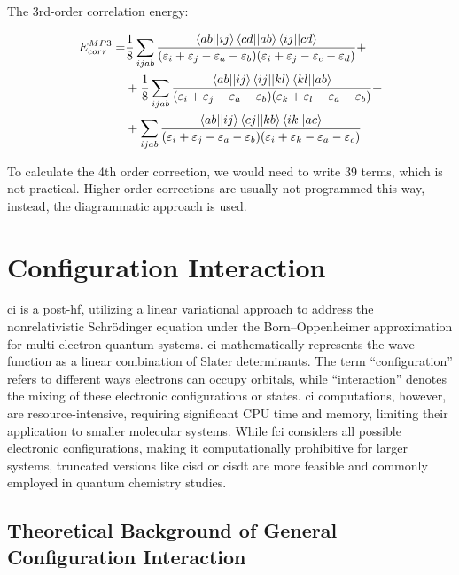 \documentclass[open=any,parskip=half,11pt]{scrbook}
\begin{document}
The 3rd-order correlation energy:

\begin{align}
E_{corr}^{MP3}=&\frac{1}{8}\sum_{ijab}\frac{\braket{ab||ij}\braket{cd||ab}\braket{ij||cd}}{(\varepsilon_i+\varepsilon_j-\varepsilon_a-\varepsilon_b)(\varepsilon_i+\varepsilon_j-\varepsilon_c-\varepsilon_d)}+ \\
&+\frac{1}{8}\sum_{ijab}\frac{\braket{ab||ij}\braket{ij||kl}\braket{kl||ab}}{(\varepsilon_i+\varepsilon_j-\varepsilon_a-\varepsilon_b)(\varepsilon_k+\varepsilon_l-\varepsilon_a-\varepsilon_b)}+ \\
&+\sum_{ijab}\frac{\braket{ab||ij}\braket{cj||kb}\braket{ik||ac}}{(\varepsilon_i+\varepsilon_j-\varepsilon_a-\varepsilon_b)(\varepsilon_i+\varepsilon_k-\varepsilon_a-\varepsilon_c)}
\end{align}

To calculate the 4th order correction, we would need to write 39 terms, which is not practical. Higher-order corrections are usually not programmed this way, instead, the diagrammatic approach is used.

\begin{quote}
\end{quote}
\chapter{Configuration Interaction}\label{configuration-interaction}

\acrfull{ci} is a \acrshort{post-hf}, utilizing a linear variational approach to address the nonrelativistic Schrödinger equation under the Born--Oppenheimer approximation for multi-electron quantum systems. \acrshort{ci} mathematically represents the wave function as a linear combination of Slater determinants. The term ``configuration'' refers to different ways electrons can occupy orbitals, while ``interaction'' denotes the mixing of these electronic configurations or states. \acrshort{ci} computations, however, are resource-intensive, requiring significant CPU time and memory, limiting their application to smaller molecular systems. While \acrfull{fci} considers all possible electronic configurations, making it computationally prohibitive for larger systems, truncated versions like \acrfull{cisd} or \acrfull{cisdt} are more feasible and commonly employed in quantum chemistry studies.

\section{Theoretical Background of General Configuration Interaction}\label{theoretical-background-of-general-configuration-interaction}
\end{document}
